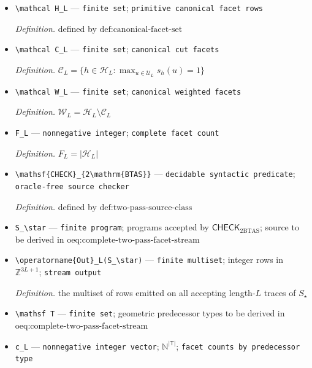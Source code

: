 \documentclass{article}
\begin{document}
\begin{itemize}
  \item \texttt{\textbackslash{}\allowbreak{}mathcal H\_\allowbreak{}L} --- \texttt{finite set}; \texttt{primitive canonical facet rows}
  \par\smallskip\noindent\emph{Definition.} defined by \(\text{def:canonical-facet-set}\)
  \item \texttt{\textbackslash{}\allowbreak{}mathcal C\_\allowbreak{}L} --- \texttt{finite set}; \texttt{canonical cut facets}
  \par\smallskip\noindent\emph{Definition.} \(\mathcal C_L=\{h\in\mathcal H_L:\max_{u\in\mathcal U_L}s_h(u)=1\}\)
  \item \texttt{\textbackslash{}\allowbreak{}mathcal W\_\allowbreak{}L} --- \texttt{finite set}; \texttt{canonical weighted facets}
  \par\smallskip\noindent\emph{Definition.} \(\mathcal W_L=\mathcal H_L\setminus\mathcal C_L\)
  \item \texttt{F\_\allowbreak{}L} --- \texttt{nonnegative integer}; \texttt{complete facet count}
  \par\smallskip\noindent\emph{Definition.} \(F_L=|\mathcal H_L|\)
  \item \texttt{\textbackslash{}\allowbreak{}mathsf\{CHECK\}\allowbreak{}\_\allowbreak{}\{2\textbackslash{}\allowbreak{}mathrm\{BTAS\}\allowbreak{}\}\allowbreak{}} --- \texttt{decidable syntactic predicate}; \texttt{oracle-\allowbreak{}free source checker}
  \par\smallskip\noindent\emph{Definition.} defined by \(\text{def:two-pass-source-class}\)
  \item \texttt{S\_\allowbreak{}\textbackslash{}\allowbreak{}star} --- \texttt{finite program}; programs accepted by \(\mathsf{CHECK}_{2\mathrm{BTAS}}\); source to be derived in \(\text{oeq:complete-two-pass-facet-stream}\)
  \item \texttt{\textbackslash{}\allowbreak{}operatorname\{Out\}\allowbreak{}\_\allowbreak{}L(S\_\allowbreak{}\textbackslash{}\allowbreak{}star)} --- \texttt{finite multiset}; integer rows in \(\mathbb Z^{3L+1}\); \texttt{stream output}
  \par\smallskip\noindent\emph{Definition.} the multiset of rows emitted on all accepting length-\(L\) traces of \(S_\star\)
  \item \texttt{\textbackslash{}\allowbreak{}mathsf T} --- \texttt{finite set}; geometric predecessor types to be derived in \(\text{oeq:complete-two-pass-facet-stream}\)
  \item \texttt{c\_\allowbreak{}L} --- \texttt{nonnegative integer vector}; \(\mathbb N^{|\mathsf T|}\); \texttt{facet counts by predecessor type}

\end{itemize}
\end{document}
